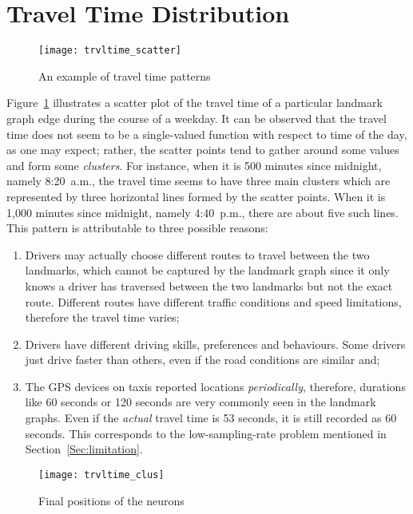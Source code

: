 \section{Travel Time Distribution}
\begin{figure}[h!]
\texttt{[image: trvltime\_scatter]}
\centering
\caption{An example of travel time patterns}\label{Fig:wrkd_50m_trvltime}
\end{figure}

Figure~\ref{Fig:wrkd_50m_trvltime} illustrates a scatter plot of the travel time of a particular landmark graph edge during the course of a weekday. It can be observed that the travel time does not seem to be a single-valued function with respect to time of the day, as one may expect; rather, the scatter points tend to gather around some values and form some \emph{clusters}. For instance, when it is 500 minutes since midnight, namely 8:20~a.m., the travel time seems to have three main clusters which are represented by three horizontal lines formed by the scatter points. When it is 1,000 minutes since midnight, namely 4:40~p.m., there are about five such lines. This pattern is attributable to three possible reasons:
\begin{enumerate}
\item Drivers may actually choose different routes to travel between the two landmarks, which cannot be captured by the landmark graph since it only knows a driver has traversed between the two landmarks but not the exact route. Different routes have different traffic conditions and speed limitations, therefore the travel time varies;
\item Drivers have different driving skills, preferences and behaviours. Some drivers just drive faster than others, even if the road conditions are similar and;
\item The GPS devices on taxis reported locations \emph{periodically}, therefore, durations like 60 seconds or 120 seconds are very commonly seen in the landmark graphs. Even if the \emph{actual} travel time is 53 seconds, it is still recorded as 60 seconds. This corresponds to the low-sampling-rate problem mentioned in Section~\ref{Sec:limitation}. 
\end{enumerate}

\begin{figure}[h!]
\centering
\texttt{[image: trvltime\_clus]} 
\caption{Final positions of the neurons}\label{Fig:trvltime_clus}
\end{figure}

